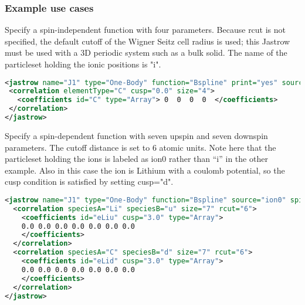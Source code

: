 \subsubsection{Example use cases}
\label{sec:1bjsplineexamples}

Specify a spin-independent function with four parameters. Because rcut  is not 
specified, the default cutoff of the Wigner Seitz cell radius is used; this 
Jastrow must be used with a 3D periodic system such as a bulk solid. The name of 
the particleset holding the ionic positions is "i".
\begin{lstlisting}[language=xml]
<jastrow name="J1" type="One-Body" function="Bspline" print="yes" source="i">
 <correlation elementType="C" cusp="0.0" size="4">
   <coefficients id="C" type="Array"> 0  0  0  0  </coefficients>
 </correlation>
</jastrow>
\end{lstlisting}

Specify a spin-dependent function with seven upspin and seven downspin parameters. 
The cutoff distance is set to 6 atomic units.  Note here that the particleset holding
the ions is labeled as ion0 rather than ``i'' in the other example.  Also in this case
the ion is Lithium with a coulomb potential, so the cusp condition is satisfied by 
setting cusp="d".
\begin{lstlisting}[language=xml]
<jastrow name="J1" type="One-Body" function="Bspline" source="ion0" spin="yes">
  <correlation speciesA="Li" speciesB="u" size="7" rcut="6">
    <coefficients id="eLiu" cusp="3.0" type="Array"> 
    0.0 0.0 0.0 0.0 0.0 0.0 0.0
    </coefficients>
  </correlation>
  <correlation speciesA="C" speciesB="d" size="7" rcut="6">
    <coefficients id="eLid" cusp="3.0" type="Array"> 
    0.0 0.0 0.0 0.0 0.0 0.0 0.0
    </coefficients>
  </correlation>
</jastrow>
\end{lstlisting}

